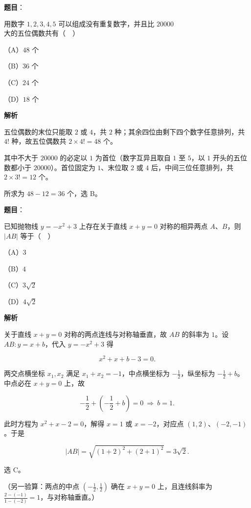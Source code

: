 \begin{answer}

\textbf{题目}：

用数字 $1,2,3,4,5$ 可以组成没有重复数字，并且比 $20000$ 大的五位偶数共有（　）

（A）$48$ 个

（B）$36$ 个

（C）$24$ 个

（D）$18$ 个

\textbf{解析}

五位偶数的末位只能取 $2$ 或 $4$，共 $2$ 种；其余四位由剩下四个数字任意排列，共 $4!$ 种，故五位偶数共 $2\times4!=48$ 个。

其中不大于 $20000$ 的必定以 $1$ 为首位（数字互异且取自 $1$ 至 $5$，以 $1$ 开头的五位数都小于 $20000$）。首位固定为 $1$、末位取 $2$ 或 $4$ 后，中间三位任意排列，共 $2\times3!=12$ 个。

所求为 $48-12=36$ 个，选 B。


\end{answer}
\begin{answer}

\textbf{题目}：

已知抛物线 $y=-x^2+3$ 上存在关于直线 $x+y=0$ 对称的相异两点 $A$、$B$，则 $|AB|$ 等于（　）

（A）$3$

（B）$4$

（C）$3\sqrt2$

（D）$4\sqrt2$

\textbf{解析}

关于直线 $x+y=0$ 对称的两点连线与对称轴垂直，故 $AB$ 的斜率为 $1$。设 $AB:y=x+b$，代入 $y=-x^2+3$ 得

\nopagebreak[4]
\[x^2+x+b-3=0 .\]

两交点横坐标 $x_1,x_2$ 满足 $x_1+x_2=-1$，中点横坐标为 $-\frac12$，纵坐标为 $-\frac12+b$。中点必在 $x+y=0$ 上，故

\nopagebreak[4]
\[-\frac12+\left(-\frac12+b\right)=0\ \Longrightarrow\ b=1 .\]

此时方程为 $x^2+x-2=0$，解得 $x=1$ 或 $x=-2$，对应点 $(1,2)$、$(-2,-1)$。于是

\nopagebreak[4]
\[|AB|=\sqrt{(1+2)^2+(2+1)^2}=3\sqrt2 .\]

选 C。

（另一验算：两点的中点 $\left(-\frac12,\frac12\right)$ 确在 $x+y=0$ 上，且连线斜率为 $\frac{2-(-1)}{1-(-2)}=1$，与对称轴垂直。）


\end{answer}
